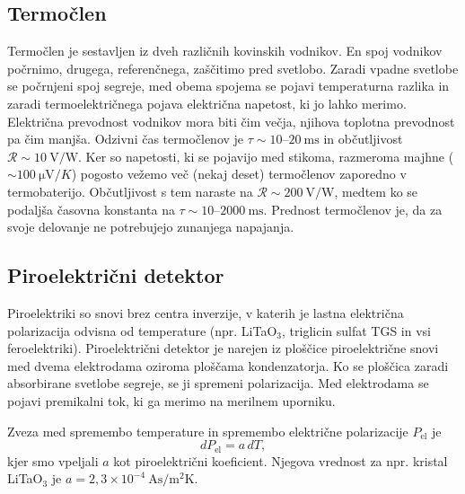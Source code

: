 \subsection*{Termočlen}
Termočlen je sestavljen iz dveh različnih kovinskih vodnikov. 
En spoj vodnikov počrnimo, drugega, 
referenčnega, zaščitimo pred svetlobo. Zaradi vpadne svetlobe se počrnjeni spoj 
segreje, med obema spojema se pojavi temperaturna razlika in zaradi termoelektričnega 
pojava električna napetost, ki jo lahko merimo. Električna prevodnost
vodnikov mora biti čim večja, njihova toplotna prevodnost pa čim manjša. Odzivni čas termočlenov je 
$\tau \sim 10$--$20~\si{\milli\second}$ in občutljivost $\mathcal{R} \sim 10~\si{\volt/\watt}$.
Ker so napetosti, ki se pojavijo med stikoma, razmeroma majhne 
($\sim 100~\si{\micro\volt/K}$) pogosto vežemo več (nekaj deset) termočlenov zaporedno v
termobaterijo. Občutljivost s tem naraste na $\mathcal{R} \sim 200~\si{\volt/\watt}$, medtem ko se 
podaljša časovna konstanta na $\tau \sim 10$--$2000~\si{\milli\second}$. Prednost termočlenov je,
da za svoje delovanje ne potrebujejo zunanjega napajanja. 

\subsection*{Piroelektrični detektor}
Piroelektriki so snovi brez centra inverzije, 
v katerih je lastna električna 
polarizacija odvisna od temperature (npr. LiTaO$_3$, 
triglicin sulfat TGS in vsi feroelektriki). Piroelektrični detektor je narejen iz 
ploščice piroelektrične snovi med dvema elektrodama oziroma ploščama kondenzatorja.
Ko se ploščica zaradi absorbirane svetlobe segreje, se ji spremeni polarizacija. Med 
elektrodama se pojavi premikalni tok, ki ga merimo na merilnem uporniku.

Zveza med spremembo temperature in spremembo električne polarizacije $P_\mathrm{el}$ je
\begin{equation}
dP_\mathrm{el} = a\, dT,
\end{equation}
kjer smo vpeljali $a$ kot piroelektrični koeficient. Njegova vrednost za npr. kristal 
LiTaO$_3$ je $a = 2,3 \times 10^{-4}~\si{\ampere \second /\metre^2 \kelvin}$.

